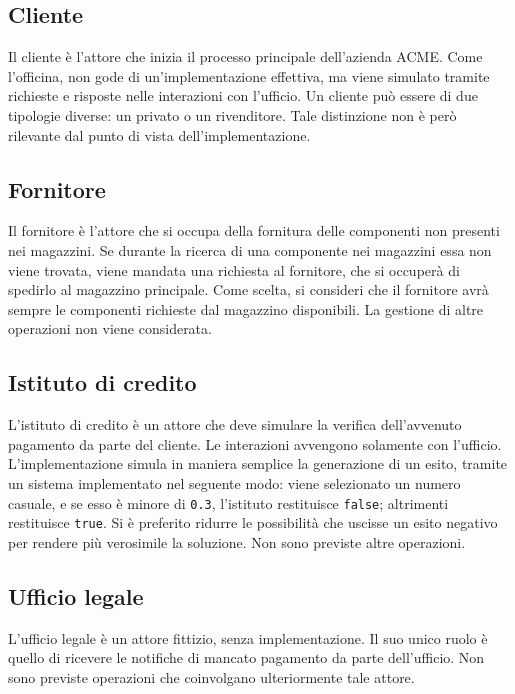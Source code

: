 \subsection{Cliente}
Il cliente \`e l'attore che inizia il processo principale dell'azienda
ACME.
Come l'officina, non gode di un'implementazione effettiva, ma viene
simulato tramite richieste e risposte nelle interazioni con l'ufficio.
Un cliente pu\`o essere di due tipologie diverse: un privato o un
rivenditore. Tale distinzione non \`e per\`o rilevante dal punto di
vista dell'implementazione.

\subsection{Fornitore}
Il fornitore \`e l'attore che si occupa della fornitura delle componenti
non presenti nei magazzini. Se durante la ricerca di una componente nei
magazzini essa non viene trovata, viene mandata una richiesta al
fornitore, che si occuper\`a di spedirlo al magazzino principale. Come
scelta, si consideri che il fornitore avr\`a sempre le componenti
richieste dal magazzino disponibili. La gestione di altre operazioni non
viene considerata.

\subsection{Istituto di credito}
L'istituto di credito \`e un attore che deve simulare la verifica
dell'avvenuto pagamento da parte del cliente.
Le interazioni avvengono solamente con l'ufficio.
L'implementazione simula in maniera semplice la generazione di un esito,
tramite un sistema implementato nel seguente modo: viene selezionato un
numero casuale, e se esso \`e minore di {\tt 0.3}, l'istituto
restituisce {\tt false}; altrimenti restituisce {\tt true}. Si \`e
preferito ridurre le possibilit\`a che uscisse un esito negativo per
rendere pi\`u verosimile la soluzione. Non sono previste altre
operazioni.

\subsection{Ufficio legale}
L'ufficio legale \`e un attore fittizio, senza implementazione. Il suo
unico ruolo \`e quello di ricevere le notifiche di mancato pagamento da
parte dell'ufficio. Non sono previste operazioni che coinvolgano
ulteriormente tale attore.
